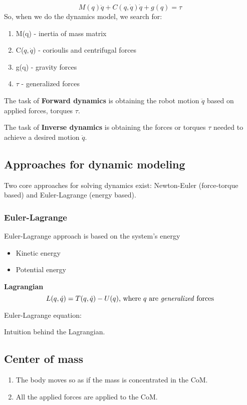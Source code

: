 \[M(q) \ddot q + C(q, \dot q) \dot q + g(q) = \tau\]
So, when we do the dynamics model, we search for: 

\begin{enumerate}
    \item M(q) - inertia of mass matrix
    \item C($q, \dot q$) - corioulis and centrifugal forces
    \item g(q) - gravity forces
    \item $\tau$ - generalized forces
\end{enumerate}

The task of \textbf{Forward dynamics} is  obtaining the robot motion $\ddot q$ based on applied forces, torques $\tau$. 

The task of \textbf{Inverse dynamics} is obtaining the forces or torques $\tau$ needed to achieve a desired motion $\ddot q$.  



\subsection{Approaches for dynamic modeling}
Two core approaches for solving dynamics exist: Newton-Euler (force-torque based) and Euler-Lagrange (energy based). 

\subsubsection{Euler-Lagrange}


Euler-Lagrange approach is based on the system's energy

\begin{itemize}
    \item Kinetic energy
    \item Potential energy
\end{itemize}

\textbf{Lagrangian}
\[L(q, \dot q) = T(q, \dot q) - U(q) \text{, where $q$ are \textit{generalized} forces}\]

Euler-Lagrange equation:
\[\]


Intuition behind the Lagrangian. 

\subsection{Center of mass}

\begin{enumerate}
    \item The body moves so as if the mass is concentrated in the CoM. 
    \item All the applied forces are applied to the CoM.
\end{enumerate}


